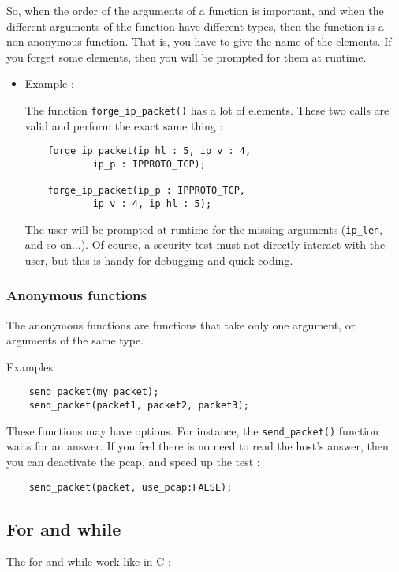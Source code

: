 \documentclass{article}
\begin{document}
So, when the order of the arguments of a function is important,
and when the different arguments of the function have different
types, then the function is a non anonymous function. That is,
you have to give the name of the elements. If you forget
some elements, then you will be prompted for them at 
runtime.

\begin{itemize}


\item Example :

The function \verb+forge_ip_packet()+ has a lot of elements. These
two calls are valid and perform the exact same thing :
\begin{verbatim}
	forge_ip_packet(ip_hl : 5, ip_v : 4, 
			ip_p : IPPROTO_TCP);
			
	forge_ip_packet(ip_p : IPPROTO_TCP,
			ip_v : 4, ip_hl : 5);
\end{verbatim}
			
The user will be prompted at runtime for the missing
arguments (\verb+ip_len+, and so on...). Of course, a 
security test must not directly interact with the user, but
this is handy for debugging and quick coding.
\end{itemize}

\subsubsection{Anonymous functions}

 The anonymous functions are functions that take only one argument,
or arguments of the same type.

Examples :
\begin{verbatim}
	send_packet(my_packet);
	send_packet(packet1, packet2, packet3);
\end{verbatim}	
These functions may have options. For instance, the \verb+send_packet()+
function waits for an answer. If you feel there is no need to
read the host's answer, then you can deactivate the pcap, and
speed up the test :
\begin{verbatim}
	send_packet(packet, use_pcap:FALSE);
\end{verbatim}	
	


\subsection{For and while}
	
The for and while work like in C :
\end{document}
